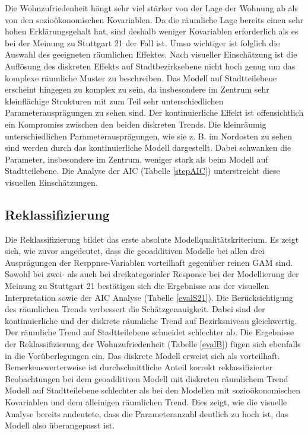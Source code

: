 \documentclass{Vorlage}
\begin{document}
Die Wohnzufriedenheit hängt sehr viel stärker von der Lage der Wohnung ab als von den sozioökonomischen Kovariablen. Da die räumliche Lage bereits einen sehr hohen Erklärungsgehalt hat, sind deshalb weniger Kovariablen erforderlich als es bei der Meinung zu Stuttgart 21 der Fall ist. Umso wichtiger ist folglich die Auswahl des geeigneten räumlichen Effektes. Nach visueller Einschätzung ist die Auflösung des diskreten Effekts auf Stadtbezirksebene nicht hoch genug um das komplexe räumliche Muster zu beschreiben. Das Modell auf Stadtteilebene erscheint hingegen zu komplex zu sein, da insbesondere im Zentrum sehr kleinflächige Strukturen mit zum Teil sehr unterschiedlichen Parameterausprägungen zu sehen sind. Der kontinuierliche Effekt ist offensichtlich ein Kompromiss zwischen den beiden diskreten Trends. Die kleinräumig unterschiedlichen Parameterausprägungen, wie sie z. B. im Nordosten zu sehen sind werden durch das kontinuierliche Modell dargestellt. Dabei schwanken die Parameter, insbesondere im Zentrum, weniger stark als beim Modell auf Stadtteilebene. Die Analyse der AIC (Tabelle \ref{stepAIC}) unterstreicht diese visuellen Einschätzungen.

\subsection{Reklassifizierung}
Die Reklassifizierung bildet das erste absolute Modellqualitätskriterium. Es zeigt sich, wie zuvor angedeutet, dass die geoadditiven Modelle bei allen drei Ausprägungen der Resppnse-Variablen vorteilhaft gegenüber reinen GAM sind. Sowohl bei zwei- als auch bei dreikategorialer Response bei der Modellierung der Meinung zu Stuttgart 21 bestätigen sich die Ergebnisse aus der visuellen Interpretation sowie der AIC Analyse (Tabelle \ref{evalS21}). Die Berücksichtigung des räumlichen Trends verbessert die Schätzgenauigkeit. Dabei sind der kontinuierliche und der diskrete räumliche Trend auf Bezirksniveau gleichwertig. Der räumliche Trend auf Stadtteilebene schneidet schlechter ab. Die Ergebnisse der Reklassifizierung der Wohnzufriedenheit (Tabelle \ref{evalB}) fügen sich ebenfalls in die Vorüberlegungen ein. Das diskrete Modell erweist sich als vorteilhaft. Bemerkenswerterweise ist durchschnittliche Anteil korrekt reklassifizierter Beobachtungen bei dem geoadditiven Modell mit diskreten räumlichem Trend Modell auf Stadtteilebene schlechter als bei den Modellen mit sozioökonomischen Kovariablen und dem alleinigen räumlichen Trend. Dies zeigt, wie die visuelle Analyse bereits andeutete, dass die Parameteranzahl deutlich zu hoch ist, das Modell also überangepasst ist.
\end{document}
